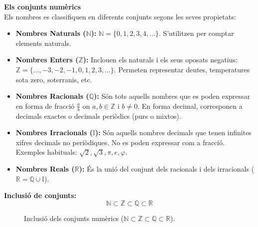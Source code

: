 \documentclass[12pt]{article}
\begin{document}
\begin{concept}
\textbf{Els conjunts numèrics}\\
Els nombres es classifiquen en diferents conjunts segons les seves propietats:
\begin{itemize}
    \item \textbf{Nombres Naturals ($\mathbb{N}$):} $\mathbb{N} = \{0, 1, 2, 3, 4, \dots\}$. S'utilitzen per comptar elements naturals.
    \item \textbf{Nombres Enters ($\mathbb{Z}$):} Inclouen els naturals i els seus oposats negatius: $\mathbb{Z} = \{\dots, -3, -2, -1, 0, 1, 2, 3, \dots\}$. Permeten representar deutes, temperatures sota zero, soterranis, etc.
    \item \textbf{Nombres Racionals ($\mathbb{Q}$):} Són tots aquells nombres que es poden expressar en forma de fracció $\frac{a}{b}$ on $a, b \in \mathbb{Z}$ i $b \neq 0$. En forma decimal, corresponen a decimals exactes o decimals periòdics (purs o mixtos).
    \item \textbf{Nombres Irracionals ($\mathbb{I}$):} Són aquells nombres decimals que tenen infinites xifres decimals no periòdiques. No es poden expressar com a fracció. Exemples habituals: $\sqrt{2}, \sqrt{3}, \pi, e, \varphi$.
    \item \textbf{Nombres Reals ($\mathbb{R}$):} És la unió del conjunt dels racionals i dels irracionals ($\mathbb{R} = \mathbb{Q} \cup \mathbb{I}$).
\end{itemize}

\textbf{Inclusió de conjunts:}
\[ \mathbb{N} \subset \mathbb{Z} \subset \mathbb{Q} \subset \mathbb{R} \]

\begin{figure}[H]
\centering
{}
\caption{Inclusió dels conjunts numèrics ($\mathbb{N} \subset \mathbb{Z} \subset \mathbb{Q} \subset \mathbb{R}$).}
\end{figure}
\end{concept}
\end{document}
